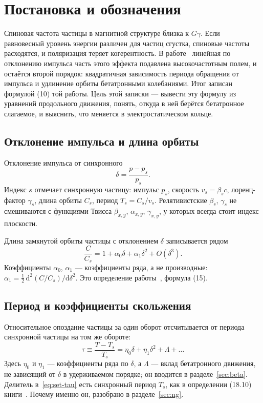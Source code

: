 \section{Постановка и обозначения}
\label{sec:setup}

Спиновая частота частицы в магнитной структуре близка к $G\gamma$. Если равновесный уровень энергии различен для частиц сгустка, спиновые частоты расходятся, и поляризация теряет когерентность. В работе~\cite{Senichev2013} линейная по отклонению импульса часть этого эффекта подавлена высокочастотным полем, и остаётся второй порядок: квадратичная зависимость периода обращения от импульса и удлинение орбиты бетатронными колебаниями. Итог записан формулой (10) той работы. Цель этой записки --- вывести эту формулу из уравнений продольного движения, понять, откуда в ней берётся бетатронное слагаемое, и выяснить, что меняется в электростатическом кольце.

\subsection{Отклонение импульса и длина орбиты}

Отклонение импульса от синхронного
\begin{equation}
\label{eq:set-delta}
\delta=\frac{p-p_s}{p_s}.
\end{equation}
Индекс $s$ отмечает синхронную частицу: импульс $p_s$, скорость $v_s=\beta_s c$, лоренц-фактор $\gamma_s$, длина орбиты $C_s$, период $T_s=C_s/v_s$. Релятивистские $\beta_s$, $\gamma_s$ не смешиваются с функциями Твисса $\beta_{x,y}$, $\alpha_{x,y}$, $\gamma_{x,y}$, у которых всегда стоит индекс плоскости.

Длина замкнутой орбиты частицы с отклонением $\delta$ записывается рядом
\begin{equation}
\label{eq:set-C}
\frac{C}{C_s}=1+\alpha_0\delta+\alpha_1\delta^2+O(\delta^3).
\end{equation}
Коэффициенты $\alpha_0$, $\alpha_1$ --- коэффициенты ряда, а не производные: $\alpha_1=\tfrac12\,\mathrm{d}^2(C/C_s)/\mathrm{d}\delta^2$. Это определение работы~\cite{Senichev2013}, формула (15).

\subsection{Период и коэффициенты скольжения}

Относительное опоздание частицы за один оборот отсчитывается от периода синхронной частицы на том же обороте:
\begin{equation}
\label{eq:set-tau}
\tau\equiv\frac{T-T_s}{T_s}=\eta_0\delta+\eta_1\delta^2+\Lambda+\ldots
\end{equation}
Здесь $\eta_0$ и $\eta_1$ --- коэффициенты ряда по $\delta$, а $\Lambda$ --- вклад бетатронного движения, не зависящий от $\delta$ в удерживаемом порядке; он вводится в разделе~\ref{sec:beta}. Делитель в~\eqref{eq:set-tau} есть синхронный период $T_s$, как в определении (18.10) книги~\cite{Ng2006}. Почему именно он, разобрано в разделе~\ref{sec:ng}.

